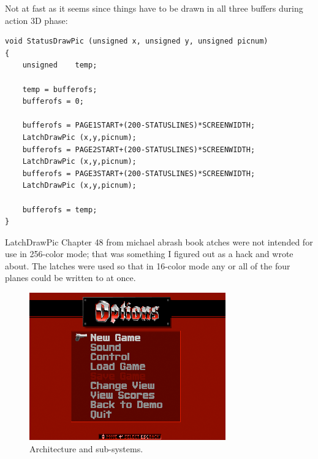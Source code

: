 Not at fast as it seems since things have to be drawn in all three buffers during action 3D phase:
\begin{verbatim}
void StatusDrawPic (unsigned x, unsigned y, unsigned picnum)
{
	unsigned	temp;

	temp = bufferofs;
	bufferofs = 0;

	bufferofs = PAGE1START+(200-STATUSLINES)*SCREENWIDTH;
	LatchDrawPic (x,y,picnum);
	bufferofs = PAGE2START+(200-STATUSLINES)*SCREENWIDTH;
	LatchDrawPic (x,y,picnum);
	bufferofs = PAGE3START+(200-STATUSLINES)*SCREENWIDTH;
	LatchDrawPic (x,y,picnum);

	bufferofs = temp;
}
\end{verbatim}
LatchDrawPic
Chapter 48 from michael abrash book
atches were not intended for use in 256-color mode; that was something I figured out as a hack and wrote about. The latches were used so that in 16-color mode any or all of the four planes could be written to at once.
\par
\begin{figure}[H]
\centering
\includegraphics[width=\textwidth]{imgs/first_menu.png}
\caption{Architecture and sub-systems.}
\end{figure}